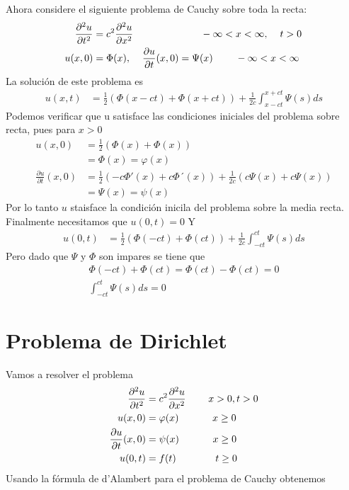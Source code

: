 \documentclass[11pt]{book}
\theoremstyle{plain}
\theoremstyle{definition}
\begin{document}
Ahora considere el siguiente problema de Cauchy sobre toda la recta:
\begin{align*}
    \frac{\partial^2 u}{\partial t^2} &= c^2 \frac{\partial^2 u}{\partial x^2} \hspace{24mm} -\infty<x<\infty,\hspace{4mm}  t > 0\\ 
    u(x,0)&= \Phi(x), \hspace{4mm} 
    \frac{\partial u}{\partial t}(x,0) = \Psi(x) \hspace{8mm} -\infty<x<\infty\
\end{align*}
La solución de este problema es
\begin{align*}
    u(x,t) & = \frac{1}{2}\left( \Phi(x - ct) + \Phi(x + ct)\right) +\frac{1}{2c}\int_{x-ct}^{x+ct}\Psi(s)ds
\end{align*}
Podemos verificar que u satisface las condiciones iniciales del problema sobre recta, pues para $x>0$
\begin{align*}
    u(x,0) & = \frac{1}{2}\left( \Phi(x) + \Phi(x)\right)\\
    &= \Phi(x) = \varphi(x)\\
    \frac{\partial u}{\partial t}(x,0) & = \frac{1}{2}\left( -c \Phi'(x) + c\Phi´(x)\right) + \frac{1}{2c}\left( c \Psi(x) +c\Psi(x)\right)\\
    &= \Psi(x) = \psi(x)
\end{align*}
Por lo tanto $u$ staisface la condición inicila del problema sobre la media recta. Finalmente necesitamos que $u(0,t) = 0$ Y
\begin{align*}
    u(0,t) &= \frac{1}{2}\left( \Phi(- ct) + \Phi(ct)\right) +\frac{1}{2c}\int_{-ct}^{ct}\Psi(s)ds
\end{align*}
Pero dado que $\Psi$ y $\Phi$ son impares se tiene que
\begin{align*}
    \Phi(- ct) + \Phi(ct) = \Phi(ct) - \Phi(ct) = 0 \\
    \int_{-ct}^{ct}\Psi(s)ds = 0
\end{align*}
\section{Problema de Dirichlet}

\setcounter{equation}{0}
Vamos a resolver el problema
\begin{align}
    \frac{\partial^2 u}{\partial t^2} &= c^2 \frac{\partial^2 u}{\partial x^2} \hspace{8mm} x > 0, t > 0\\ 
    u(x,0)&= \varphi(x) \hspace{12mm} x \geq 0\\
    \frac{\partial u}{\partial t}(x,0) &= \psi(x) \hspace{12mm} x \geq 0\\
    u(0,t) &= f(t) \hspace{14mm} t \geq 0
\end{align}
Usando la fórmula de d'Alambert para el problema de Cauchy obtenemos
\end{document}
